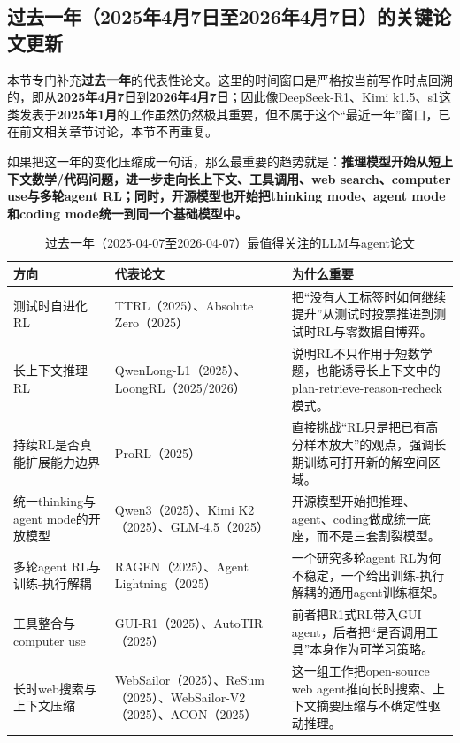 \documentclass[12pt,a4paper]{article}
\begin{document}
\subsection{过去一年（2025年4月7日至2026年4月7日）的关键论文更新}

本节专门补充\textbf{过去一年}的代表性论文。这里的时间窗口是严格按当前写作时点回溯的，即从\textbf{2025年4月7日}到\textbf{2026年4月7日}；因此像DeepSeek-R1、Kimi k1.5、s1这类发表于\textbf{2025年1月}的工作虽然仍然极其重要，但不属于这个“最近一年”窗口，已在前文相关章节讨论，本节不再重复。

如果把这一年的变化压缩成一句话，那么最重要的趋势就是：\textbf{推理模型开始从短上下文数学/代码问题，进一步走向长上下文、工具调用、web search、computer use与多轮agent RL；同时，开源模型也开始把thinking mode、agent mode和coding mode统一到同一个基础模型中。}

\begin{table}[H]
\centering
\small
\caption{过去一年（2025-04-07至2026-04-07）最值得关注的LLM与agent论文}
\begin{tabular}{p{2.5cm}p{5.0cm}p{5.0cm}}
\toprule
\textbf{方向} & \textbf{代表论文} & \textbf{为什么重要} \\
\midrule
测试时自进化RL & TTRL（2025）、Absolute Zero（2025） & 把“没有人工标签时如何继续提升”从测试时投票推进到测试时RL与零数据自博弈。 \\
长上下文推理RL & QwenLong-L1（2025）、LoongRL（2025/2026） & 说明RL不只作用于短数学题，也能诱导长上下文中的plan-retrieve-reason-recheck模式。 \\
持续RL是否真能扩展能力边界 & ProRL（2025） & 直接挑战“RL只是把已有高分样本放大”的观点，强调长期训练可打开新的解空间区域。 \\
统一thinking与agent mode的开放模型 & Qwen3（2025）、Kimi K2（2025）、GLM-4.5（2025） & 开源模型开始把推理、agent、coding做成统一底座，而不是三套割裂模型。 \\
多轮agent RL与训练-执行解耦 & RAGEN（2025）、Agent Lightning（2025） & 一个研究多轮agent RL为何不稳定，一个给出训练-执行解耦的通用agent训练框架。 \\
工具整合与computer use & GUI-R1（2025）、AutoTIR（2025） & 前者把R1式RL带入GUI agent，后者把“是否调用工具”本身作为可学习策略。 \\
长时web搜索与上下文压缩 & WebSailor（2025）、ReSum（2025）、WebSailor-V2（2025）、ACON（2025） & 这一组工作把open-source web agent推向长时搜索、上下文摘要压缩与不确定性驱动推理。 \\
\bottomrule
\end{tabular}
\end{table}
\end{document}
